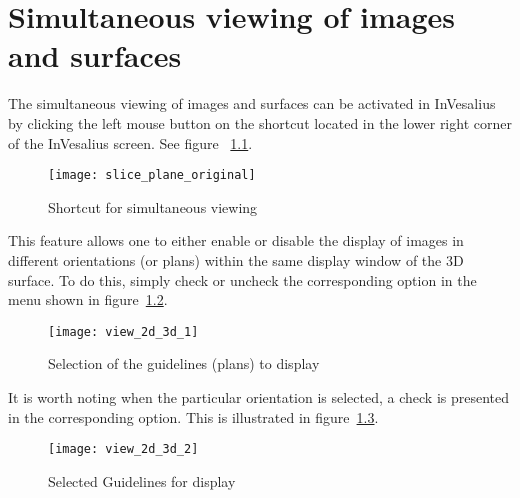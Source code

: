 \chapter{Simultaneous viewing of images and surfaces}

The simultaneous viewing of images and surfaces can be activated in InVesalius by clicking the left mouse button on the shortcut located in the lower right corner of the InVesalius screen. See figure~ \ref{fig:slice_plane_original}.

\begin{figure}[!htb]
\centering
\texttt{[image: slice\_plane\_original]}
\caption{Shortcut for simultaneous viewing}
\label{fig:slice_plane_original}
\end{figure}


This feature allows one to either enable or disable the display of images in different orientations (or plans) within the same display window of the 3D surface. To do this, simply check or uncheck the corresponding option in the menu shown in figure~\ref{fig:view_2d_3d_1}.

\begin{figure}[!htb]
\centering
\texttt{[image: view\_2d\_3d\_1]}
\caption{Selection of the guidelines (plans) to display}
\label{fig:view_2d_3d_1}
\end{figure}


It is worth noting when the particular orientation is selected, a check is presented in the corresponding option. This is illustrated in figure~\ref{fig:view_2d_3d_2}.

\begin{figure}[!htb]
\centering
\texttt{[image: view\_2d\_3d\_2]}
\caption{Selected Guidelines for display}
\label{fig:view_2d_3d_2}
\end{figure}


